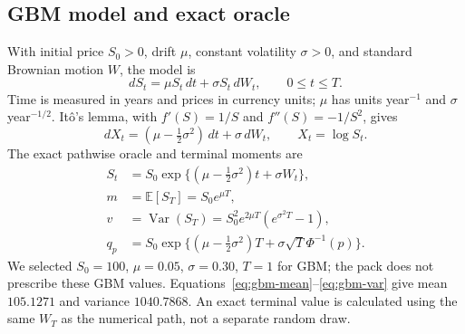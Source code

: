 \documentclass[11pt,a4paper]{article}
\begin{document}
\subsection{GBM model and exact oracle}\label{sec:gbm-model}
With initial price $S_0>0$, drift $\mu$, constant volatility $\sigma>0$, and standard Brownian motion $W$, the model is
\begin{equation}\label{eq:gbm-sde}
dS_t=\mu S_t\,dt+\sigma S_t\,dW_t,\qquad 0\le t\le T.
\end{equation}
Time is measured in years and prices in currency units; $\mu$ has units year$^{-1}$ and $\sigma$ year$^{-1/2}$. It\^o's lemma, with $f'(S)=1/S$ and $f''(S)=-1/S^2$, gives
\begin{equation}\label{eq:gbm-log}
dX_t=(\mu-\tfrac12\sigma^2)\,dt+\sigma\,dW_t,\qquad X_t=\log S_t.
\end{equation}
The exact pathwise oracle and terminal moments are
\begin{align}
S_t&=S_0\exp\{(\mu-\tfrac12\sigma^2)t+\sigma W_t\},\label{eq:exact}\\
m&=\mathbb E[S_T]=S_0e^{\mu T},\label{eq:gbm-mean}\\
v&=\operatorname{Var}(S_T)=S_0^2e^{2\mu T}(e^{\sigma^2T}-1),\label{eq:gbm-var}\\
q_p&=S_0\exp\{(\mu-\tfrac12\sigma^2)T+\sigma\sqrt T\Phi^{-1}(p)\}.\label{eq:gbm-quantile}
\end{align}
We selected $S_0=100$, $\mu=0.05$, $\sigma=0.30$, $T=1$ for GBM; the pack does not prescribe these GBM values. Equations~\eqref{eq:gbm-mean}--\eqref{eq:gbm-var} give mean $105.1271$ and variance $1040.7868$. An exact terminal value is calculated using the same $W_T$ as the numerical path, not a separate random draw.
\end{document}
